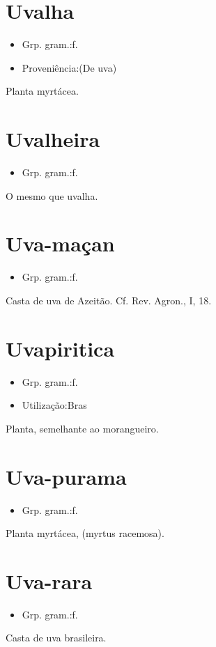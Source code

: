 \documentclass{article}
\begin{document}
\section{Uvalha}
\begin{itemize}
\item {Grp. gram.:f.}
\end{itemize}
\begin{itemize}
\item {Proveniência:(De \textunderscore uva\textunderscore )}
\end{itemize}
Planta myrtácea.
\section{Uvalheira}
\begin{itemize}
\item {Grp. gram.:f.}
\end{itemize}
O mesmo que \textunderscore uvalha\textunderscore .
\section{Uva-maçan}
\begin{itemize}
\item {Grp. gram.:f.}
\end{itemize}
Casta de uva de Azeitão. Cf. \textunderscore Rev. Agron.\textunderscore , I, 18.
\section{Uvapiritica}
\begin{itemize}
\item {Grp. gram.:f.}
\end{itemize}
\begin{itemize}
\item {Utilização:Bras}
\end{itemize}
Planta, semelhante ao morangueiro.
\section{Uva-purama}
\begin{itemize}
\item {Grp. gram.:f.}
\end{itemize}
Planta myrtácea, (\textunderscore myrtus racemosa\textunderscore ).
\section{Uva-rara}
\begin{itemize}
\item {Grp. gram.:f.}
\end{itemize}
Casta de uva brasileira.
\end{document}

